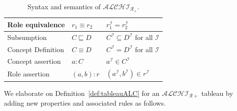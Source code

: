\documentclass{article}
\begin{document}
\begin{center}
\begin{table}[H]
\begin{tabular}{|p{4cm} | p{2cm} | p{10cm}| }
    Role equivalence & $r_1\equiv r_2$ & $r_1^\mathcal{I} = r_2^\mathcal{I}$\\    \hline
    Subsumption & $C\sqsubseteq D$ & $C^\mathcal{I}\subseteq D^\mathcal{I}$ for all $\mathcal{I}$\\
    Concept Definition & $C\equiv D$ & $C^\mathcal{I}= D^\mathcal{I}$ for all $\mathcal{I}$\\ \hline
    Concept assertion & $a:C$ & $a^\mathcal{I}\in C^\mathcal{I}$ \\
    Role assertion & $(a,b):r$ & $(a^\mathcal{I},b^\mathcal{I})\in r^\mathcal{I}$ \\ \hline
    \end{tabular}
    \caption{Syntax and semantics of $\mathcal{ALCHI_{R_+}}$.}
    \label{tab:interpretation}
\end{table}
\end{center} 
We elaborate on Definition~\ref{def:tableauALC} for an $\mathcal{ALCHI_{R+}}$ tableau by adding new properties and associated rules as follows.
\end{document}
